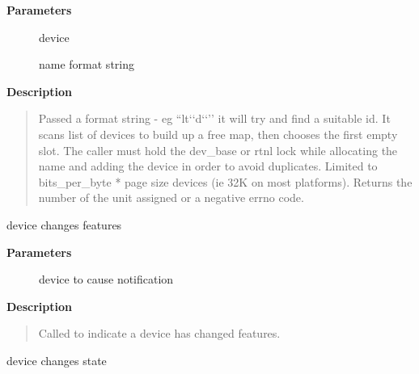 \documentclass[a4paper,8pt,english]{sphinxmanual}
\begin{document}
\textbf{Parameters}
\begin{description}
\item[{}] \leavevmode
device

\item[{}] \leavevmode
name format string

\end{description}

\textbf{Description}
\begin{quote}

Passed a format string - eg ``lt{}`{}`d{}`{}`'' it will try and find a suitable
id. It scans list of devices to build up a free map, then chooses
the first empty slot. The caller must hold the dev\_base or rtnl lock
while allocating the name and adding the device in order to avoid
duplicates.
Limited to bits\_per\_byte * page size devices (ie 32K on most platforms).
Returns the number of the unit assigned or a negative errno code.
\end{quote}

\begin{fulllineitems}
\label{networking/kapi:c.netdev_features_change}
device changes features

\end{fulllineitems}


\textbf{Parameters}
\begin{description}
\item[{}] \leavevmode
device to cause notification

\end{description}

\textbf{Description}
\begin{quote}

Called to indicate a device has changed features.
\end{quote}

\begin{fulllineitems}
\label{networking/kapi:c.netdev_state_change}
device changes state

\end{fulllineitems}
\end{document}
